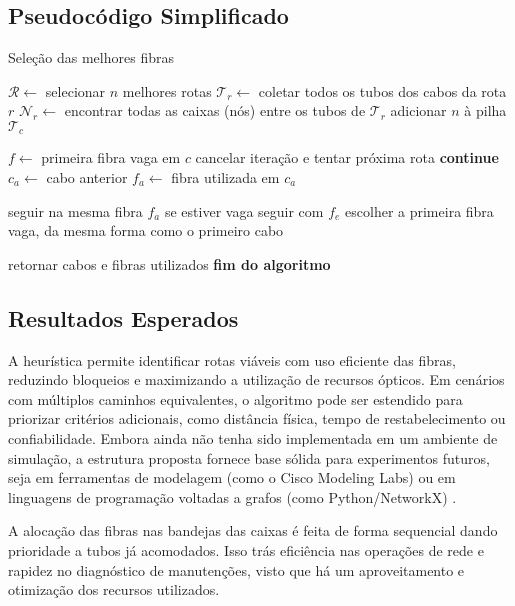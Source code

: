 \subsection{Pseudocódigo Simplificado}

\begin{algorithm}[H]
\caption{Seleção das melhores fibras}
\begin{algorithmic}[1]
\State $\mathcal{R} \gets$ selecionar $n$ melhores rotas
    \State $\mathcal{T}_r \gets$ coletar todos os tubos dos cabos da rota $r$
    \State $\mathcal{N}_r \gets$ encontrar todas as caixas (nós) entre os tubos de $\mathcal{T}_r$
            \State adicionar $n$ à pilha $\mathcal{T}_{c}$
        \EndIf
    \EndFor

            \State $f \gets$ primeira fibra vaga em $c$
                \State cancelar iteração e tentar próxima rota
                \State \textbf{continue}
            \EndIf
        \Else
            \State $c_{a} \gets$ cabo anterior
            \State $f_{a} \gets$ fibra utilizada em $c_{a}$

                \State seguir na mesma fibra $f_{a}$ se estiver vaga
                \State seguir com $f_{e}$
            \Else
                \State escolher a primeira fibra vaga, da mesma forma como o primeiro cabo
            \EndIf
        \EndIf
    \EndFor

    \State retornar cabos e fibras utilizados
\EndFor
\State \textbf{fim do algoritmo}
\end{algorithmic}
\end{algorithm}

\subsection{Resultados Esperados}

A heurística permite identificar rotas viáveis com uso eficiente das fibras,
reduzindo bloqueios e maximizando a utilização de recursos ópticos. Em cenários
com múltiplos caminhos equivalentes, o algoritmo pode ser estendido para
priorizar critérios adicionais, como distância física, tempo de
restabelecimento ou confiabilidade. Embora ainda não tenha sido implementada em
um ambiente de simulação, a estrutura proposta fornece base sólida para
experimentos futuros, seja em ferramentas de modelagem (como o Cisco Modeling
Labs) ou em linguagens de programação voltadas a grafos (como Python/NetworkX) \cite{alwayn2004optical}.

A alocação das fibras nas bandejas das caixas é feita de forma sequencial 
dando prioridade a tubos já acomodados. Isso trás eficiência nas operações de
rede e rapidez no diagnóstico de manutenções, visto que há um aproveitamento e
otimização dos recursos utilizados.

